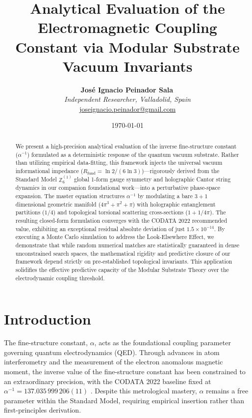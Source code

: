 \documentclass[12pt,a4paper]{article}
\title{\textbf{Analytical Evaluation of the Electromagnetic Coupling Constant via Modular Substrate Vacuum Invariants}}
\author{
  \textbf{José Ignacio Peinador Sala}\,\orcidlink{0009-0008-1822-3452} \\
  \textit{Independent Researcher, Valladolid, Spain} \\
  \small\href{mailto:joseignacio.peinador@gmail.com}{joseignacio.peinador@gmail.com}
}
\date{\today}
\begin{document}
\maketitle


\begin{abstract}
We present a high-precision analytical evaluation of the inverse fine-structure constant ($\alpha^{-1}$) formulated as a deterministic response of the quantum vacuum substrate. Rather than utilizing empirical data-fitting, this framework injects the universal vacuum informational impedance ($R_{\text{fund}} = \ln 2 / (6 \ln 3)$)—rigorously derived from the Standard Model $\mathbb{Z}_6^{(1)}$ global 1-form gauge symmetry and holographic Cantor string dynamics in our companion foundational work—into a perturbative phase-space expansion. The master equation structures $\alpha^{-1}$ by modulating a bare $3+1$ dimensional geometric manifold ($4\pi^3 + \pi^2 + \pi$) with holographic entanglement partitions ($1/4$) and topological torsional scattering cross-sections ($1 + 1/4\pi$). The resulting closed-form formulation converges with the CODATA 2022 recommended value, exhibiting an exceptional residual absolute deviation of just $1.5 \times 10^{-14}$. By executing a Monte Carlo simulation to address the Look-Elsewhere Effect, we demonstrate that while random numerical matches are statistically guaranteed in dense unconstrained search spaces, the mathematical rigidity and predictive closure of our framework depend strictly on pre-established topological invariants. This application solidifies the effective predictive capacity of the Modular Substrate Theory over the electrodynamic coupling threshold.
\end{abstract}


\section{Introduction}

The fine-structure constant, $\alpha$, acts as the foundational coupling parameter governing quantum electrodynamics (QED). Through advances in atom interferometry and the measurement of the electron anomalous magnetic moment, the inverse value of the fine-structure constant has been constrained to an extraordinary precision, with the CODATA 2022 baseline fixed at $\alpha^{-1} = 137.035\,999\,206(11)$ \cite{codata2022}. Despite this metrological mastery, $\alpha$ remains a free parameter within the Standard Model, requiring empirical insertion rather than first-principles derivation.
\end{document}

